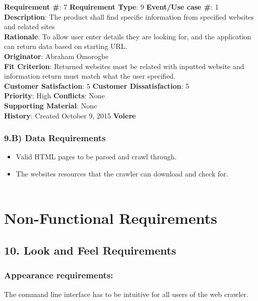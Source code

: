 \documentclass[12pt]{article}
\begin{document}
\begin{framed}
\textbf{Requirement \#}: 7 \hfill \textbf{Requirement Type}: 9 \hfill\textbf{Event/Use case \#}: 1 \hfill\\
\textbf{Description}:  The product shall find specific information from specified websites and related sites\\
\textbf{Rationale}: To allow user enter details they are looking for, and the application can return data based on starting URL.\\
\textbf{Originator}: Abraham Omorogbe\\
\textbf{Fit Criterion}: Returned websites most be related with inputted website and information return must match what the user specified.\\
\textbf{Customer Satisfaction}: 5 \hfill 	\textbf{Customer Dissatisfaction}: 5 \hfill\\
\textbf{Priority}: High \hfill \textbf{Conflicts}: None \hfill 		\\
\textbf{Supporting Material}: None\\
\textbf{History}: Created October 9, 2015 \hfill	 \textbf{Volere}\hfill

\end{framed}

\subsubsection{9.B) Data Requirements}
\begin{itemize}
  \item Valid HTML pages to be parsed and crawl through.
  \item The websites resources that the crawler can download and check for. \\ \\
\end{itemize}


\section{Non-Functional Requirements}

\subsection{10. Look and Feel Requirements}

\subsubsection{Appearance requirements:}  The command line interface has to be intuitive for all users of the web crawler.
\end{document}
